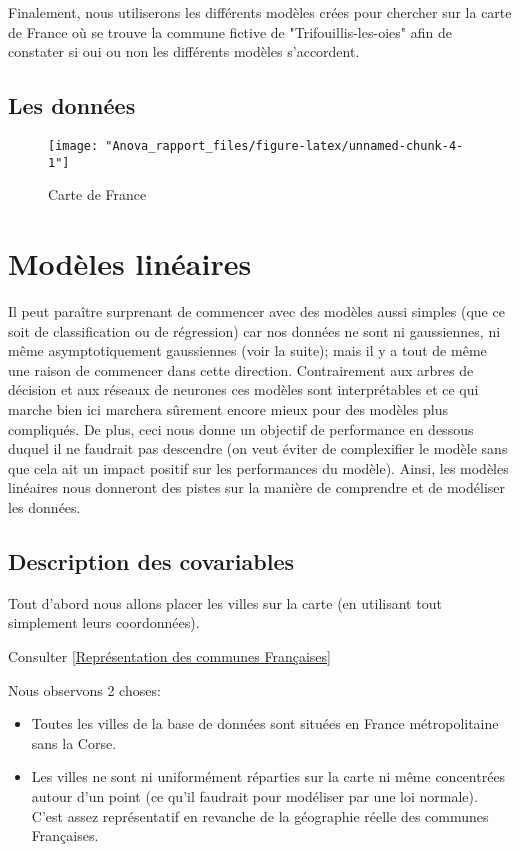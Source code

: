 \documentclass[french]{article}%
\begin{document}
				Finalement, nous utiliserons les différents modèles crées pour chercher sur la carte de France où se trouve la commune fictive de "Trifouillis-les-oies" afin de constater si oui ou non les différents modèles s'accordent.
				
		\subsection*{Les données}
		
				\begin{figure}
					\centering
					\texttt{[image: "Anova\_rapport\_files/figure-latex/unnamed-chunk-4-1"]}
					\caption{Carte de France}
					\label{Représentation des communes Françaises}
				\end{figure}
			
		\tableofcontents
		\newpage
		
	\section{Modèles linéaires}
	
		Il peut paraître surprenant de commencer avec des modèles aussi simples (que ce soit de classification ou de régression) car nos données ne sont ni gaussiennes, ni même asymptotiquement gaussiennes (voir la suite); mais il y a tout de même une raison de commencer dans cette direction. Contrairement aux arbres de décision et aux réseaux de neurones ces modèles sont interprétables et ce qui marche bien ici marchera sûrement encore mieux pour des modèles plus compliqués. De plus, ceci nous donne un objectif de performance en dessous duquel il ne faudrait pas descendre (on veut éviter de complexifier le modèle sans que cela ait un impact positif sur les performances du modèle). Ainsi, les modèles linéaires nous donneront des pistes sur la manière de comprendre et de modéliser les données.
		
	\subsection{Description des covariables}
	
		Tout d'abord nous allons placer les villes sur la carte (en utilisant tout simplement leurs coordonnées).
		
		Consulter \autoref{Représentation des communes Françaises} 
		
		Nous observons 2 choses:
		\begin{itemize}
		
			\item Toutes les villes de la base de données sont situées en France métropolitaine sans la Corse.
		
			\item Les villes ne sont ni uniformément réparties sur la carte ni même concentrées autour d'un point (ce qu'il faudrait pour modéliser par une loi normale). C'est assez représentatif en revanche de la géographie réelle des communes Françaises.
			
		\end{itemize}
		
\end{document}
